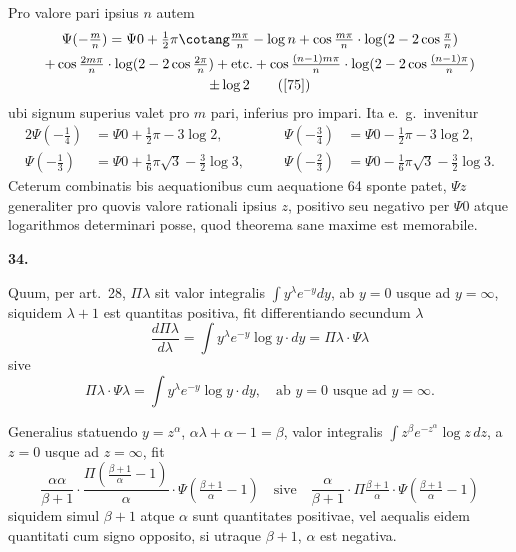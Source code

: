 \documentclass[12pt,a4paper]{article}
\newcommand{\art}[1]{\par\medskip\noindent\textbf{#1.}\par\nopagebreak\smallskip}
\begin{document}
Pro valore pari ipsius $n$ autem
\begin{multline}
\Psi(-\tfrac{m}{n}) = \Psi0 + \tfrac{1}{2}\pi\cotang\tfrac{m\pi}{n} - \log n + \cos\tfrac{m\pi}{n}\cdot\log(2-2\cos\tfrac{\pi}{n})\\
+ \cos\tfrac{2m\pi}{n}\cdot\log(2-2\cos\tfrac{2\pi}{n}) + \text{etc.} + \cos\tfrac{(n-1)m\pi}{n}\cdot\log(2-2\cos\tfrac{(n-1)\pi}{n})\\
\pm\log2\tag{[75]}
\end{multline}
ubi signum superius valet pro $m$ pari, inferius pro impari. Ita e.\ g.\ invenitur
\begin{alignat*}{2}
\Psi(-\tfrac{1}{4}) &= \Psi0 + \tfrac{1}{2}\pi - 3\log2,\qquad & \Psi(-\tfrac{3}{4}) &= \Psi0 - \tfrac{1}{2}\pi - 3\log2,\\
\Psi(-\tfrac{1}{3}) &= \Psi0 + \tfrac{1}{6}\pi\surd3 - \tfrac{3}{2}\log3,\qquad & \Psi(-\tfrac{2}{3}) &= \Psi0 - \tfrac{1}{6}\pi\surd3 - \tfrac{3}{2}\log3.
\end{alignat*}
Ceterum combinatis bis aequationibus cum aequatione 64 sponte patet, $\Psi z$ generaliter pro quovis valore rationali ipsius $z$, positivo seu negativo per $\Psi0$ atque logarithmos determinari posse, quod theorema sane maxime est memorabile.

\art{34}

Quum, per art.\ 28, $\Pi\lambda$ sit valor integralis $\int\!y^\lambda e^{-y}dy$, ab $y=0$ usque ad $y=\infty$, siquidem $\lambda+1$ est quantitas positiva, fit differentiando secundum $\lambda$
\[
\frac{d\Pi\lambda}{d\lambda} = \int\!y^\lambda e^{-y}\log y\cdot dy = \Pi\lambda\cdot\Psi\lambda
\]
sive
\begin{equation}
\Pi\lambda\cdot\Psi\lambda = \int\!y^\lambda e^{-y}\log y\cdot dy,\quad \text{ab }y=0\text{ usque ad }y=\infty.\tag{[76]}
\end{equation}

Generalius statuendo $y=z^\alpha$, $\alpha\lambda+\alpha-1=\beta$, valor integralis $\int\!z^\beta e^{-z^\alpha}\log z\,dz$, a $z=0$ usque ad $z=\infty$, fit
\begin{equation}
\frac{\alpha\alpha}{\beta+1}\cdot\frac{\Pi(\frac{\beta+1}{\alpha}-1)}{\alpha}\cdot\Psi(\tfrac{\beta+1}{\alpha}-1)\quad \text{sive}\quad \frac{\alpha}{\beta+1}\cdot\Pi\tfrac{\beta+1}{\alpha}\cdot\Psi(\tfrac{\beta+1}{\alpha}-1)\tag{[art.\ 34]}
\end{equation}
siquidem simul $\beta+1$ atque $\alpha$ sunt quantitates positivae, vel aequalis eidem quantitati cum signo opposito, si utraque $\beta+1$, $\alpha$ est negativa.
\end{document}
